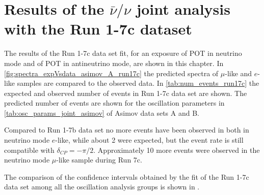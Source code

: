 
\clearpage

\section {Results of the $\bar{\nu}/\nu$ joint analysis with the Run 1-7c dataset}
\label{sec:results_run17c}

The results of the Run 1-7c data set fit,
for an exposure 
of \TotalPotNuRunOneSevenC POT in neutrino mode
and
of \TotalPotNuBarRunOneSevenC POT in antineutrino mode, 
are shown in this chapter.
In \cref{fig:spectra_expVsdata_asimov_A_run17c} the predicted spectra of $\mu$-like and $e$-like samples
are compared to the observed data.
In \cref{tab:num_events_run17c} the expected and observed number of events in Run 1-7c data set are shown.
The predicted number of events are shown for the oscillation parameters in \cref{tab:osc_params_joint_asimov}
of Asimov data sets A and B.

Compared to Run 1-7b data set no more events have been observed in both in neutrino mode $e$-like,
while about 2 were expected,
but the event rate is still compatible with $\delta_{CP} = -\pi/2$.
Approximately 10 more events were observed in the neutrino mode $\mu$-like sample during Run 7c.

The comparison of the confidence intervals obtained by the fit of the Run 1-7c data set
among all the oscillation analysis groups is shown in \cite{Mach3JointFitRun16}.

